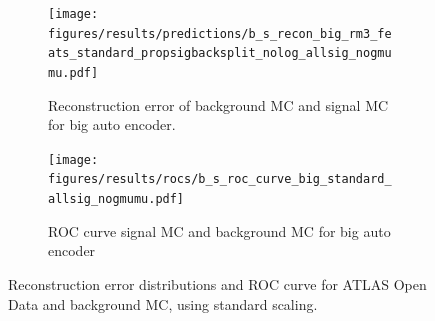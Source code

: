 \documentclass[ reprint, amsmath,amssymb, aps, nofootinbib]{revtex4-2}
\begin{document}
\begin{figure}[h]
     \centering
     \begin{subfigure}[b]{0.46\textwidth}
        \centering
    \texttt{[image: figures/results/predictions/b\_s\_recon\_big\_rm3\_feats\_standard\_propsigbacksplit\_nolog\_allsig\_nogmumu.pdf]}
    \caption{Reconstruction error of background MC and signal MC for big auto encoder. }
    \label{fig:s_b_big_pred_stand}
     \end{subfigure}
     \hfill
     \begin{subfigure}[b]{0.46\textwidth}
         \centering
         \texttt{[image: figures/results/rocs/b\_s\_roc\_curve\_big\_standard\_allsig\_nogmumu.pdf]}
         \caption{ROC curve signal MC and background MC for big auto encoder}
         \label{fig:s_b_big_roc_stand}
     \end{subfigure}
     
        \caption{Reconstruction error distributions and ROC curve for ATLAS Open Data and background MC, using standard scaling.}
        \label{fig:roc_sig_big_stand}
\end{figure}
\end{document}
